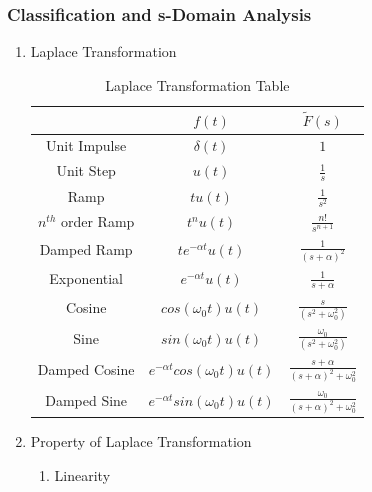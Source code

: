 \documentclass{article}
\begin{document}
\subsubsection{Classification and s-Domain Analysis}
\begin{enumerate}
    \item Laplace Transformation
        \begin{table}[h]
            \setlength{\arrayrulewidth}{0.3mm}
            \renewcommand{\arraystretch}{1.93}
            \centering
            \begin{tabular}{|c|c|c|}
            \hline
               & $f(t)$ & $\tilde{F}(s)$ \\
            \hline
            Unit Impulse & $\delta(t)$ & $1$ \\
            \hline
            Unit Step & $u(t)$ & $\displaystyle\frac{1}{s}$ \\
            \hline
            Ramp & $tu(t)$ & $\displaystyle \frac{1}{s^2}$ \\
            \hline
            $n^{th}$ order Ramp & $t^nu(t)$ & $\displaystyle \frac{n!}{s^{n+1}}$ \\
            \hline
            Damped Ramp & $\displaystyle te^{-\alpha t}u(t)$ & $\displaystyle \frac{1}{(s+\alpha)^2}$ \\
            \hline
            Exponential & $\displaystyle e^{-\alpha t}u(t)$ & $\displaystyle\frac{1}{s+\alpha}$ \\
            \hline
            Cosine & $cos(\omega_0t)u(t)$ & $\displaystyle \frac{s}{(s^2+\omega_0^2)}$\\
            \hline
            Sine & $sin(\omega_0t)u(t)$ & $\displaystyle \frac{\omega_0}{(s^2+\omega_0^2)}$\\
            \hline
            Damped Cosine & $\displaystyle e^{-\alpha t}cos(\omega_0t)u(t)$ & $\displaystyle \frac{s+\alpha}{(s+\alpha)^2+\omega_0^2}$ \\
            \hline
            Damped Sine & $\displaystyle e^{-\alpha t}sin(\omega_0t)u(t)$ & $\displaystyle \frac{\omega_0}{(s+\alpha)^2+\omega_0^2}$\\
            \hline
            \end{tabular}
            \caption{Laplace Transformation Table}
            \label{tab:my_label}
        \end{table}
    \item Property of Laplace Transformation
    \begin{enumerate}
        \item Linearity

\end{enumerate}
\end{enumerate}
\end{document}
